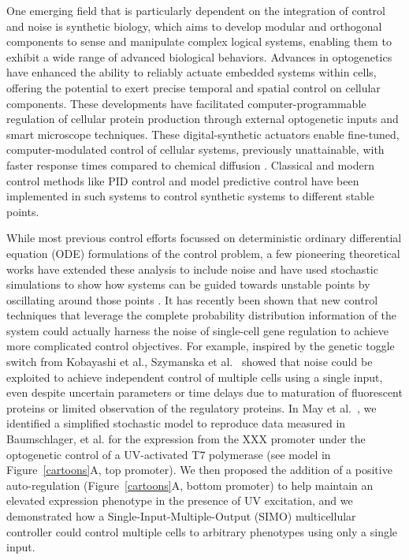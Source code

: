\documentclass[12pt]{iopart}
\begin{document}
One emerging field that is particularly dependent on the integration of control and noise is synthetic biology, which aims to develop modular\cite{Ng2019} and orthogonal \cite{Liu2018} components to sense and manipulate \cite{Sheets2020} complex logical systems, enabling them to exhibit a wide range of advanced biological behaviors\cite{Shin2020}. 
Advances in optogenetics have enhanced the ability to reliably actuate embedded systems within cells, offering the potential to exert precise temporal and spatial control on cellular components\cite{Sheets2020,Baumschlager2017,Chen2020,Lillacci2018}.
These developments have facilitated computer-programmable regulation of cellular protein production through external optogenetic inputs and smart microscope techniques\cite{Fox2021,Baumschlager2021,Lugagne2017}. 
These digital-synthetic actuators enable fine-tuned, computer-modulated control of cellular systems, previously unattainable, with faster response times compared to chemical diffusion\cite{Rullan2018, Baumschlager2017} . 
Classical and modern control methods like PID control and model predictive control have been implemented in such systems\cite{} to control synthetic systems to different stable points. 

While most previous control efforts focussed on deterministic ordinary differential equation (ODE) formulations of the control problem, a few pioneering theoretical works have extended these analysis to include noise and have used stochastic simulations to show how systems can be guided towards unstable points by oscillating around those points \cite{Guarino2020}. 
It has recently been shown that new control techniques that leverage the complete probability distribution information of the system could actually harness the noise of single-cell gene regulation to achieve more complicated control objectives. 
For example, inspired by the genetic toggle switch from Kobayashi et al.\cite{Kobayashi:2004}, Szymanska et al.~\cite{Szymanska2015} showed that noise could be exploited to achieve independent control of multiple cells using a single input, even despite uncertain parameters or time delays due to maturation of fluorescent proteins or limited observation of the regulatory proteins. 
In May et al.~\cite{May2021}, we identified a simplified stochastic model to reproduce data measured in Baumschlager, et al.\cite{XXX} for the expression from the XXX promoter under the optogenetic control of a UV-activated T7 polymerase (see model in Figure\ \ref{cartoons}A, top promoter).
We then proposed the addition of a positive auto-regulation (Figure\ \ref{cartoons}A, bottom promoter) to help maintain an elevated expression phenotype in the presence of UV excitation, and we demonstrated how a Single-Input-Multiple-Output (SIMO) multicellular controller could control multiple cells to arbitrary phenotypes using only a single input. 
\end{document}
